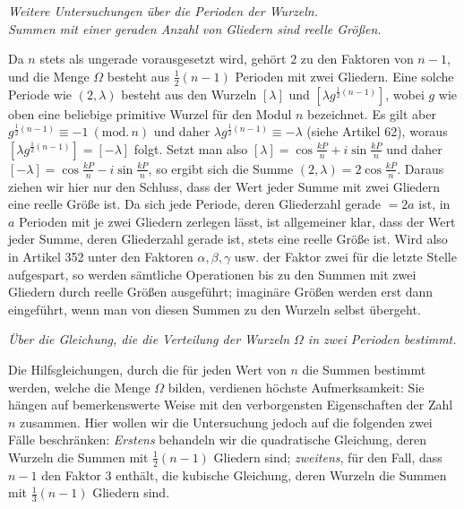 \begin{center}\itshape Weitere Untersuchungen über die Perioden der Wurzeln.\\ Summen mit einer geraden Anzahl von Gliedern sind reelle Größen.\end{center}


Da \(n\) stets als ungerade vorausgesetzt wird, gehört \(2\) zu den Faktoren von \(n-1\), und die Menge \(\Omega\) besteht aus \(\frac12(n-1)\) Perioden mit zwei Gliedern. Eine solche Periode wie \((2,\lambda)\) besteht aus den Wurzeln \([\lambda]\) und \([\lambda g^{\frac12(n-1)}]\), wobei \(g\) wie oben eine beliebige primitive Wurzel für den Modul \(n\) bezeichnet. Es gilt aber \(g^{\frac12(n-1)}\equiv-1\ (\mathrm{mod.}\,n)\) und daher \(\lambda g^{\frac12(n-1)}\equiv-\lambda\) (siehe Artikel 62), woraus \([\lambda g^{\frac12(n-1)}]=[-\lambda]\) folgt. Setzt man also \([\lambda]=\cos\frac{kP}{n}+i\sin\frac{kP}{n}\) und daher \([-\lambda]=\cos\frac{kP}{n}-i\sin\frac{kP}{n}\), so ergibt sich die Summe \((2,\lambda)=2\cos\frac{kP}{n}\). Daraus ziehen wir hier nur den Schluss, dass der Wert jeder Summe mit zwei Gliedern eine reelle Größe ist. Da sich jede Periode, deren Gliederzahl gerade \(=2a\) ist, in \(a\) Perioden mit je zwei Gliedern zerlegen lässt, ist allgemeiner klar, dass der Wert jeder Summe,
deren Gliederzahl gerade ist, stets eine reelle Größe ist. Wird also in Artikel 352 unter den Faktoren \(\alpha,\allowbreak \beta,\allowbreak \gamma\) usw. der Faktor zwei für die letzte Stelle aufgespart, so werden sämtliche Operationen bis zu den Summen mit zwei Gliedern durch reelle Größen ausgeführt; imaginäre Größen werden erst dann eingeführt, wenn man von diesen Summen zu den Wurzeln selbst übergeht.

\begin{center}\itshape Über die Gleichung, die die Verteilung der Wurzeln \(\Omega\) in zwei Perioden bestimmt.\end{center}


Die Hilfsgleichungen, durch die für jeden Wert von \(n\) die Summen bestimmt werden, welche die Menge \(\Omega\) bilden, verdienen höchste Aufmerksamkeit: Sie hängen auf bemerkenswerte Weise mit den verborgensten Eigenschaften der Zahl \(n\) zusammen. Hier wollen wir die Untersuchung jedoch auf die folgenden zwei Fälle beschränken: \textit{Erstens} behandeln wir die quadratische Gleichung, deren Wurzeln die Summen mit \(\frac12(n-1)\) Gliedern sind; \textit{zweitens}, für den Fall, dass \(n-1\) den Faktor \(3\) enthält, die kubische Gleichung, deren Wurzeln die Summen mit \(\frac13(n-1)\) Gliedern sind.

